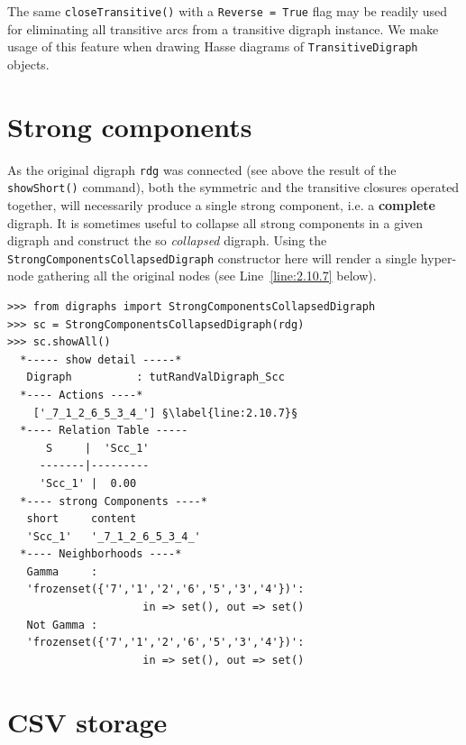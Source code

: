 The same \texttt{closeTransitive()} with a \texttt{Reverse = True} flag may be readily used for eliminating all transitive arcs from a transitive digraph instance. We make usage of this feature when drawing Hasse diagrams of \texttt{TransitiveDi\-graph} objects.

\section{Strong components}
\label{sec:2.8}

As the original digraph \texttt{rdg} was connected (see above the result of the \texttt{show\-Short()} command), both the symmetric and the transitive closures operated together, will necessarily produce a single strong component, i.e. a \textbf{complete} digraph. It is sometimes useful to collapse all strong components in a given digraph and construct the so \emph{collapsed} digraph. Using the \texttt{StrongComponentsCollapsed\-Digraph} constructor  here will render a single hyper-node gathering all the original nodes (see Line~\ref{line:2.10.7} below).
\begin{lstlisting}[caption={Computing the strong components in a digraph},label=list:2.10]
>>> from digraphs import StrongComponentsCollapsedDigraph
>>> sc = StrongComponentsCollapsedDigraph(rdg)
>>> sc.showAll()
  *----- show detail -----*
   Digraph          : tutRandValDigraph_Scc
  *---- Actions ----*
    ['_7_1_2_6_5_3_4_'] §\label{line:2.10.7}§
  *---- Relation Table -----
      S     |  'Scc_1'	  
     -------|---------
     'Scc_1' |  0.00
  *---- strong Components ----*
   short 	 content
   'Scc_1' 	 '_7_1_2_6_5_3_4_'
  *---- Neighborhoods ----*
   Gamma     :
   'frozenset({'7','1','2','6','5','3','4'})':
                     in => set(), out => set()
   Not Gamma :
   'frozenset({'7','1','2','6','5','3','4'})':
                     in => set(), out => set()
\end{lstlisting}
  
\section{CSV storage}
\label{sec:2.9}

